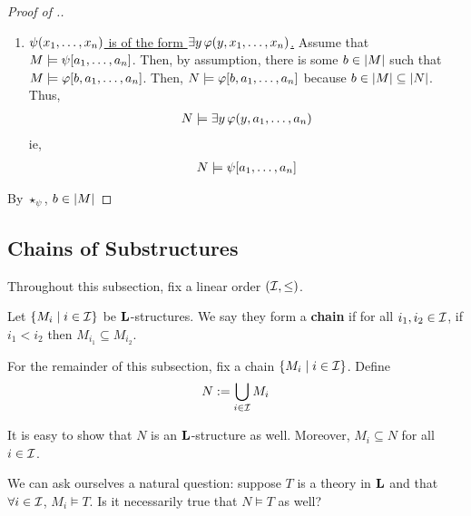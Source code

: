 \begin{proof}[Proof of .]
\begin{description}
\begin{enumerate}
            \item \underline{$\psi\!\left( x_1, \ldots, x_n \right)$ is of the form $\exists y \, \varphi\!\left( y, x_1, \ldots, x_n \right)$.} \newline
            Assume that $M \models \psi\!\left[ a_1, \ldots, a_n \right]$. Then, by assumption, there is some $b \in \left\lvert M \right\rvert$ such that $M \models \varphi\!\left[ b, a_1, \ldots, a_n \right]$. Then, $N \models \varphi\!\left[ b, a_1, \ldots, a_n \right]$ because $b \in \left\lvert M \right\rvert \subseteq \left\lvert N \right\rvert$. Thus,
            \begin{align*}
                N \models \exists y \, \varphi\!\left( y, a_1, \ldots, a_n \right)
            \end{align*}
            ie,
            \begin{align*}
                N \models \psi\!\left[ a_1, \ldots, a_n \right]
            \end{align*}
        \end{enumerate}
    \end{description}
    By $\star_{\psi}$, $b \in \left\lvert M \right\rvert$ %
\end{proof} %

\subsection{Chains of Substructures}

Throughout this subsection, fix a linear order $\left( \mathcal{I}, \le \right)$.

\begin{boxdefinition}[Chain]
    Let $\left\{ M_{i} \; \middle\vert \; i \in \mathcal{I} \right\}$ be $\mathbf{L}$-structures. We say they form a \textbf{chain} if for all $i_1, i_2 \in \mathcal{I}$, if $i_1 < i_2$ then $M_{i_1} \subseteq M_{i_2}$.
\end{boxdefinition}

\begin{boxlnotation}
    For the remainder of this subsection, fix a chain $\left\{ M_{i} \; \middle\vert \; i \in \mathcal{I} \right\}$. Define
    \begin{align*}
        N := \bigcup_{i \in \mathcal{I}} M_i
    \end{align*}
\end{boxlnotation}
It is easy to show that $N$ is an $\mathbf{L}$-structure as well. Moreover, $M_i \subseteq N$ for all $i \in \mathcal{I}$.

We can ask ourselves a natural question: suppose $T$ is a theory in $\mathbf{L}$ and that $\forall i \in \mathcal{I}$, $M_i \models T$. Is it necessarily true that $N \models T$ as well?

